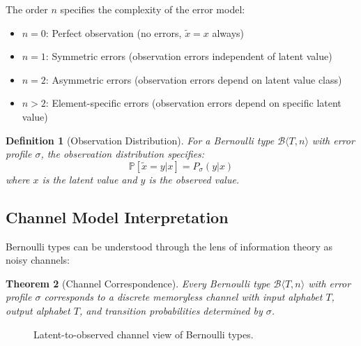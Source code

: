 \documentclass[11pt,final,hidelinks]{article}
\newtheorem{theorem}{Theorem}[section]
\newtheorem{definition}[theorem]{Definition}
\newcommand{\bernoulli}[2]{\mathcal{B}\langle #1, #2 \rangle}
\newcommand{\Prob}[1]{\mathbb{P}\left[#1\right]}
\begin{document}
The order $n$ specifies the complexity of the error model:
\begin{itemize}
    \item $n = 0$: Perfect observation (no errors, $\tilde{x} = x$ always)
    \item $n = 1$: Symmetric errors (observation errors independent of latent value)
    \item $n = 2$: Asymmetric errors (observation errors depend on latent value class)
    \item $n > 2$: Element-specific errors (observation errors depend on specific latent value)
\end{itemize}

\begin{definition}[Observation Distribution]
For a Bernoulli type $\bernoulli{T}{n}$ with error profile $\sigma$, the observation distribution specifies:
\begin{equation}
\Prob{\tilde{x} = y | x} = P_\sigma(y|x)
\end{equation}
where $x$ is the latent value and $y$ is the observed value.
\end{definition}

\subsection{Channel Model Interpretation}

Bernoulli types can be understood through the lens of information theory as noisy channels:

\begin{theorem}[Channel Correspondence]
Every Bernoulli type $\bernoulli{T}{n}$ with error profile $\sigma$ corresponds to a discrete memoryless channel with input alphabet $T$, output alphabet $T$, and transition probabilities determined by $\sigma$.
\end{theorem}

\begin{figure}[t]
\centering
{}
\caption{Latent-to-observed channel view of Bernoulli types.}
\end{figure}
\end{document}
